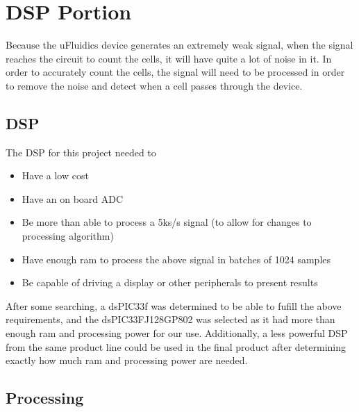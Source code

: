 \documentclass[10pt, journal]{IEEEtran}
\begin{document}
\section{DSP Portion}
Because the uFluidics device generates an extremely weak signal, when
the signal reaches the circuit to count the cells, it will have quite
a lot of noise in it. In order to accurately count the cells, the
signal will need to be processed in order to remove the noise and
detect when a cell passes through the device.

\subsection{DSP}
The DSP for this project needed to 
\begin{itemize}
\item Have a low cost
\item Have an on board ADC
\item Be more than able to process a 5ks/s signal (to allow for changes to processing algorithm)
\item Have enough ram to process the above signal in batches of 1024 samples
\item Be capable of driving a display or other peripherals to present results
\end{itemize}

After some searching, a dsPIC33f was determined to be able to fufill
the above requirements, and the dsPIC33FJ128GP802 was selected as it
had more than enough ram and processing power for our
use. Additionally, a less powerful DSP from the same product line
could be used in the final product after determining exactly how much
ram and processing power are needed.

\subsection{Processing}
\end{document}
